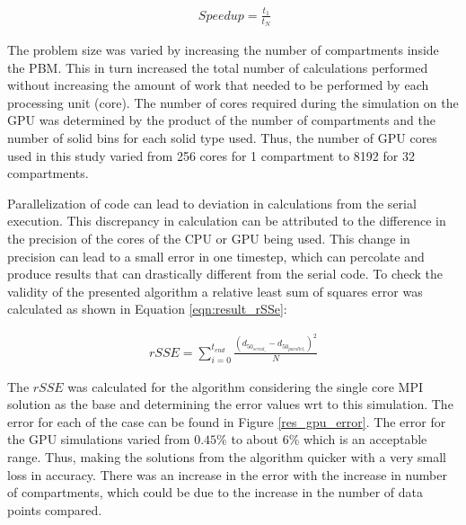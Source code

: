 \documentclass[preprint,10pt,authoryear,review]{elsarticle}
\begin{document}
\begin{align}
\ Speedup = \frac{t_1}{t_N}
\label{eqn:result_parallelefficiencyWeak}
\end{align}

The problem size was varied by increasing the number of compartments inside 
the PBM. This in turn increased the total number of calculations performed 
without increasing the amount of work that needed to be performed by each 
processing unit (core). The number of cores required during the simulation 
on the GPU was determined by the product of the number of compartments and 
the number of solid bins for each solid type used. Thus, the number of GPU 
cores used in this study varied from 256 cores for 1 compartment to 8192 
for 32 compartments.

Parallelization of code can lead to deviation in calculations from 
the serial execution. This discrepancy in calculation can be attributed to 
the difference in the precision of the cores of the CPU or GPU being used. 
This change in precision can lead to a small error in one timestep, which can 
percolate and produce results that can drastically different from the serial 
code. To check the validity of the presented algorithm a relative least sum 
of squares error was calculated as shown in Equation \ref{eqn:result_rSSe}:

\begin{align}
rSSE =  \sum_{i=0}^{t_{end}} \frac{(d_{50_{serial_i}}-d_{50_{parallel_i}})^2}{N}
\label{eqn:result_rSSe}
\end{align}

The $rSSE$ was calculated for the algorithm considering the single core MPI 
solution as the base and determining the error values wrt to this simulation.
The error for each of the case can be found in Figure \ref{res_gpu_error}. The error 
for the GPU simulations varied from $0.45\%$ to about $6\%$ which is an acceptable 
range. Thus, making the solutions from the algorithm quicker with a very small 
loss in accuracy. There was an increase in the error with the increase in number 
of compartments, which could be due to the increase in the number of data points compared. 
\end{document}
